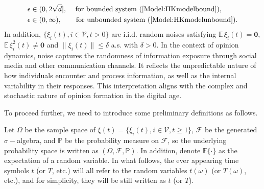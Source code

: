 \documentclass[11pt]{article}
\theoremstyle{definition}
\theoremstyle{remark}
\numberwithin{equation}{section}
\begin{document}
\begin{equation}\label{Model:confithre}
\begin{split}
  &\epsilon\in(0,2\sqrt{d}], \,\quad\text{for bounded system (\ref{Model:HKmodelbound}),} \\
  &\epsilon\in(0,\infty), \qquad\text{for unbounded system (\ref{Model:HKmodelunbound})}.
\end{split}
\end{equation}
In addition, $\{\xi_i(t), i\in\mathcal{V}, t>0\}$ are i.i.d. random noises satisfying $\mathbb{E}\, \xi_i(t)=\textbf{0}$, $\mathbb{E}\, \xi_i^2(t)\neq\textbf{0}$ and $\|\xi_i(t)\|\leq\delta$ a.s. with $\delta>0$.
In the context of opinion dynamics, noise captures the randomness of information exposure through social media and other communication channels. It reflects the unpredictable nature of how individuals encounter and process information, as well as the internal variability in their responses. This interpretation aligns with the complex and stochastic nature of opinion formation in the digital age.

To proceed further, we need to introduce some preliminary definitions as follows.

Let $\Omega$ be the sample space of $\xi(t)=\{\xi_i(t),i\in\mathcal{V}, t\geq 1\}$, $\mathcal{F}$ be the generated $\sigma-$algebra, and $\mathbb{P}$ be the probability measure on $\mathcal{F}$, so the underlying probability space is written as $(\Omega,\mathcal{F},\mathbb{P})$.
In addition, denote $\mathbb{E}\{\cdot\}$ as the expectation of a random variable.
In what follows, the ever appearing time symbols $t$ (or $T$, etc.) will all refer to the random variables $t(\omega)$ (or $T(\omega)$, etc.), and for simplicity, they will be still written as $t$ (or $T$).
\end{document}
